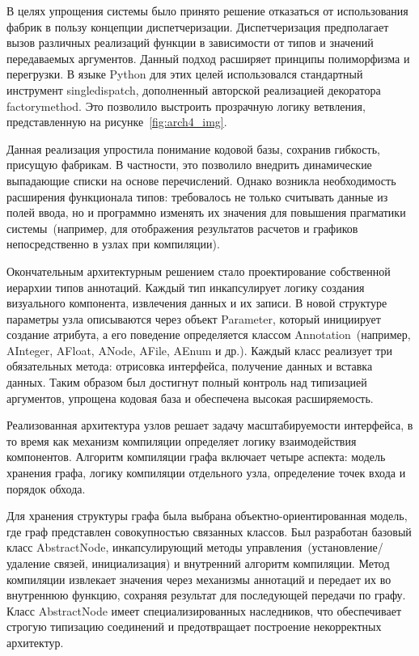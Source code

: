 \documentclass{report}
\begin{document}
В целях упрощения системы было принято решение отказаться от использования фабрик в пользу концепции диспетчеризации. Диспетчеризация предполагает вызов различных реализаций функции в зависимости от типов и значений передаваемых аргументов. Данный подход расширяет принципы полиморфизма и перегрузки. В языке Python для этих целей использовался стандартный инструмент singledispatch, дополненный авторской реализацией декоратора factorymethod. Это позволило выстроить прозрачную логику ветвления, представленную на рисунке~\ref{fig:arch4_img}.


Данная реализация упростила понимание кодовой базы, сохранив гибкость, присущую фабрикам. В частности, это позволило внедрить динамические выпадающие списки на основе перечислений. Однако возникла необходимость расширения функционала типов: требовалось не только считывать данные из полей ввода, но и программно изменять их значения для повышения прагматики системы~(например, для отображения результатов расчетов и графиков непосредственно в узлах при компиляции).

Окончательным архитектурным решением стало проектирование собственной иерархии типов аннотаций. Каждый тип инкапсулирует логику создания визуального компонента, извлечения данных и их записи. В новой структуре параметры узла описываются через объект Parameter, который инициирует создание атрибута, а его поведение определяется классом Annotation~(например, AInteger, AFloat, ANode, AFile, AEnum и др.). Каждый класс реализует три обязательных метода: отрисовка интерфейса, получение данных и вставка данных. Таким образом был достигнут полный контроль над типизацией аргументов, упрощена кодовая база и обеспечена высокая расширяемость.  


Реализованная архитектура узлов решает задачу масштабируемости интерфейса, в то время как механизм компиляции определяет логику взаимодействия компонентов. Алгоритм компиляции графа включает четыре аспекта: модель хранения графа, логику компиляции отдельного узла, определение точек входа и порядок обхода.

Для хранения структуры графа была выбрана объектно-ориентированная модель, где граф представлен совокупностью связанных классов. Был разработан базовый класс AbstractNode, инкапсулирующий методы управления~(установление/удаление связей, инициализация) и внутренний алгоритм компиляции. Метод компиляции извлекает значения через механизмы аннотаций и передает их во внутреннюю функцию, сохраняя результат для последующей передачи по графу. Класс AbstractNode имеет специализированных наследников, что обеспечивает строгую типизацию соединений и предотвращает построение некорректных архитектур.
\end{document}
